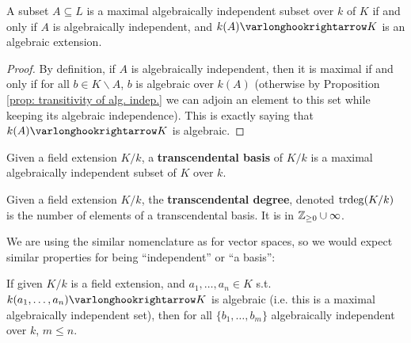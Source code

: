 \documentclass{article}
\begin{document}
\begin{proposition}\label{prop: max. alg. indep. iff alg. extension}
    A subset $A \subseteq L$ is a maximal algebraically independent subset over $k$ of $K$ if and only if $A$ is algebraically independent, and $k(A) \ext K$ is an algebraic extension. 
\end{proposition}

\begin{proof}
    By definition, if $A$ is algebraically independent, then it is maximal if and only if for all $b \in K \smallsetminus A$, $b$ is algebraic over $k(A)$ (otherwise by Proposition \ref{prop: transitivity of alg. indep.} we can adjoin an element to this set while keeping its algebraic independence). This is exactly saying that $k(A) \ext K$ is algebraic.
\end{proof}

\begin{definition}
    Given a field extension $K/k$, a \textbf{transcendental basis} of $K/k$ is a maximal algebraically independent subset of $K$ over $k$.
\end{definition}
\nogap
\begin{definition}
    Given a field extension $K/k$, the \textbf{transcendental degree}, denoted $\operatorname{trdeg}(K/k)$ is the number of elements of a transcendental basis. It is in $\mathbb{Z}_{\geq 0} \cup \infty$.
\end{definition}

\textstart
We are using the similar nomenclature as for vector spaces, so we would expect similar properties for being ``independent'' or ``a basis'':

\begin{theorem}\label{thm: cardinality of max. alg. indep. subset}
    If given $K/k$ is a field extension, and $a_1, \dots, a_n \in K$ s.t. $k(a_1, \dots, a_n) \ext K$ is algebraic (i.e. this is a maximal algebraically independent set), then for all $\{b_1, \dots, b_m\}$ algebraically independent over $k$, $m \leq n$.
\end{theorem}
\end{document}

